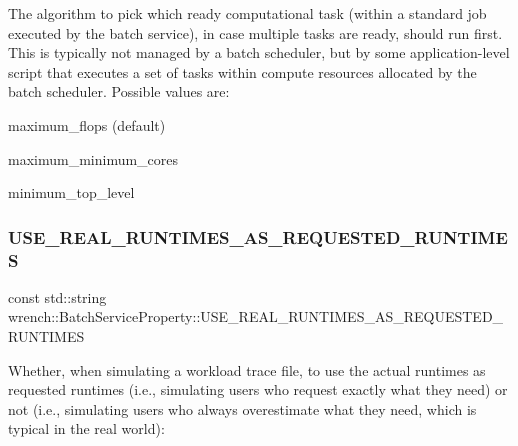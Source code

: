 The algorithm to pick which ready computational task (within a standard job executed by the batch service), in case multiple tasks are ready, should run first. This is typically not managed by a batch scheduler, but by some application-\/level script that executes a set of tasks within compute resources allocated by the batch scheduler. Possible values are\+: 


\begin{DoxyItemize}
\item maximum\+\_\+flops (default)
\item maximum\+\_\+minimum\+\_\+cores
\item minimum\+\_\+top\+\_\+level 
\end{DoxyItemize}\mbox{\label{classwrench_1_1_batch_service_property_a5f40d6321b3062091d00db8a5a9dc07e}} 
\subsubsection{\texorpdfstring{U\+S\+E\+\_\+\+R\+E\+A\+L\+\_\+\+R\+U\+N\+T\+I\+M\+E\+S\+\_\+\+A\+S\+\_\+\+R\+E\+Q\+U\+E\+S\+T\+E\+D\+\_\+\+R\+U\+N\+T\+I\+M\+ES}{USE\_REAL\_RUNTIMES\_AS\_REQUESTED\_RUNTIMES}}
{\footnotesize\ttfamily const std\+::string wrench\+::\+Batch\+Service\+Property\+::\+U\+S\+E\+\_\+\+R\+E\+A\+L\+\_\+\+R\+U\+N\+T\+I\+M\+E\+S\+\_\+\+A\+S\+\_\+\+R\+E\+Q\+U\+E\+S\+T\+E\+D\+\_\+\+R\+U\+N\+T\+I\+M\+ES\hspace{0.3cm}{\ttfamily [static]}}



Whether, when simulating a workload trace file, to use the actual runtimes as requested runtimes (i.\+e., simulating users who request exactly what they need) or not (i.\+e., simulating users who always overestimate what they need, which is typical in the real world)\+: 


